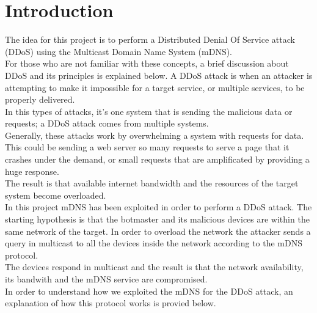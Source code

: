 \documentclass[fleqn, 10pt]{SelfArx} %
\affiliation{\textsuperscript{1}\textit{Department of Computer Engineering, University of Pavia, Pavia, Italy}} %
\affiliation{\textbf{Corresponding author}: francesco.amato01@universitadipavia.it} %
\begin{document}
\maketitle %

\tableofcontents %

\thispagestyle{empty} %


\section*{Introduction} %


The idea for this project is to perform a Distributed Denial Of Service attack (DDoS) using the Multicast Domain Name System (mDNS).\\
For those who are not familiar with these concepts, a brief discussion about DDoS and its principles is explained below.
A DDoS attack is when an attacker is attempting to make it impossible for a target service, or multiple services, to be properly delivered.\\
In this types of attacks, it’s one system that is sending the malicious data or requests; a DDoS attack comes from multiple systems.\\
Generally, these attacks work by overwhelming a system with requests for data. This could be sending a web server so many requests to serve a page that it crashes under the demand, or small requests that are amplificated by providing a huge response. \\ The result is that available internet bandwidth and the resources of the target system become overloaded.\\
In this project mDNS has been exploited in order to perform a DDoS attack. The starting hypothesis is that the botmaster and its malicious devices are within the same network of the target. In order to overload the network the attacker sends a query in multicast to all the devices inside the network according to the mDNS protocol. \\ The devices respond in multicast and the result is that the network availability, its bandwith and the mDNS service are compromised. \\
In order to understand how we exploited the mDNS for the DDoS attack, an explanation of how this protocol works is provied below.
\end{document}
